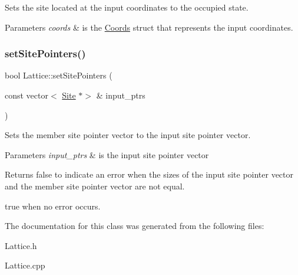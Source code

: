 Sets the site located at the input coordinates to the occupied state. 


\begin{DoxyParams}{Parameters}
{\em coords} & is the \hyperlink{struct_coords}{Coords} struct that represents the input coordinates. \\
\hline
\end{DoxyParams}
\mbox{\label{class_lattice_aaa16f46daaf157c155f0e9b378a07b5d}} 
\subsubsection{\texorpdfstring{set\+Site\+Pointers()}{setSitePointers()}}
{\footnotesize\ttfamily bool Lattice\+::set\+Site\+Pointers (\begin{DoxyParamCaption}\item[{const vector$<$ \hyperlink{class_site}{Site} $\ast$$>$ \&}]{input\+\_\+ptrs }\end{DoxyParamCaption})}



Sets the member site pointer vector to the input site pointer vector. 


\begin{DoxyParams}{Parameters}
{\em input\+\_\+ptrs} & is the input site pointer vector \\
\hline
\end{DoxyParams}
\begin{DoxyReturn}{Returns}
false to indicate an error when the sizes of the input site pointer vector and the member site pointer vector are not equal. 

true when no error occurs. 
\end{DoxyReturn}


The documentation for this class was generated from the following files\+:\begin{DoxyCompactItemize}
\item 
Lattice.\+h\item 
Lattice.\+cpp\end{DoxyCompactItemize}
